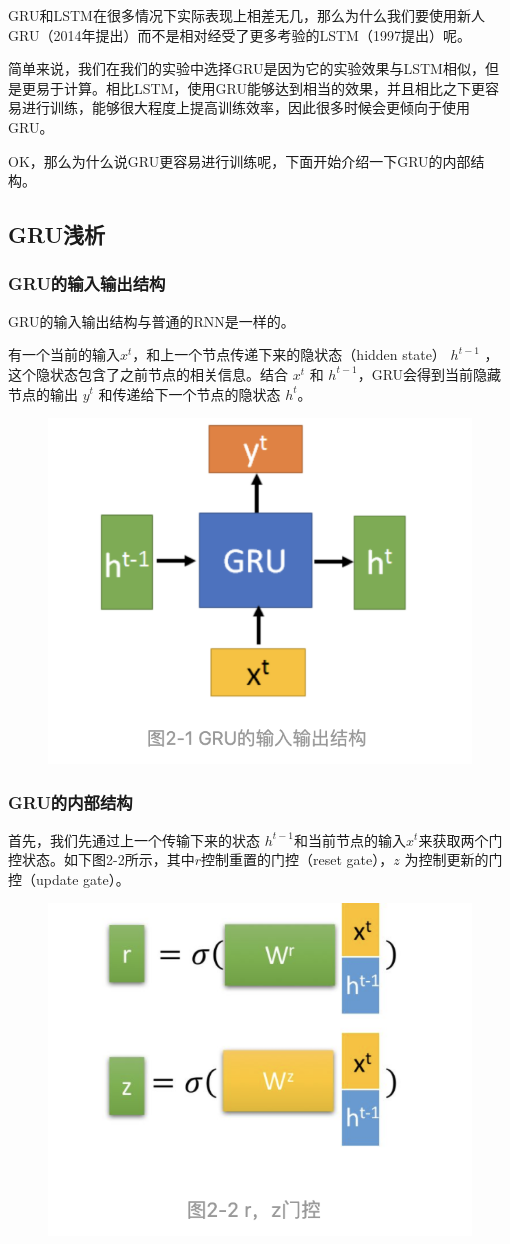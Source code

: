 \documentclass[12pt]{article}
\begin{document}
GRU和LSTM在很多情况下实际表现上相差无几，那么为什么我们要使用新人GRU（2014年提出）而不是相对经受了更多考验的LSTM（1997提出）呢。

简单来说，我们在我们的实验中选择GRU是因为它的实验效果与LSTM相似，但是更易于计算。相比LSTM，使用GRU能够达到相当的效果，并且相比之下更容易进行训练，能够很大程度上提高训练效率，因此很多时候会更倾向于使用GRU。

OK，那么为什么说GRU更容易进行训练呢，下面开始介绍一下GRU的内部结构。

\subsection{GRU浅析}
\subsubsection{GRU的输入输出结构}
GRU的输入输出结构与普通的RNN是一样的。

有一个当前的输入$x^t$，和上一个节点传递下来的隐状态（hidden state） $h^{t-1}$ ，这个隐状态包含了之前节点的相关信息。结合 $x^t$ 和 $h^{t-1}$，GRU会得到当前隐藏节点的输出 $y^t$ 和传递给下一个节点的隐状态 $h^t$。
\begin{figure}[H]
    \centering
    \includegraphics[width=.6\textwidth]{fig/GRU_Structure_InputOutput.png}
\end{figure}

\subsubsection{GRU的内部结构}
首先，我们先通过上一个传输下来的状态 $h^{t-1}$和当前节点的输入$x^t$来获取两个门控状态。如下图2-2所示，其中$r$控制重置的门控（reset gate），$z$ 为控制更新的门控（update gate）。
\begin{figure}[H]
    \centering
    \includegraphics[width=.6\textwidth]{fig/GRU_RZ_Gate.png}
\end{figure}
 
\end{document}
